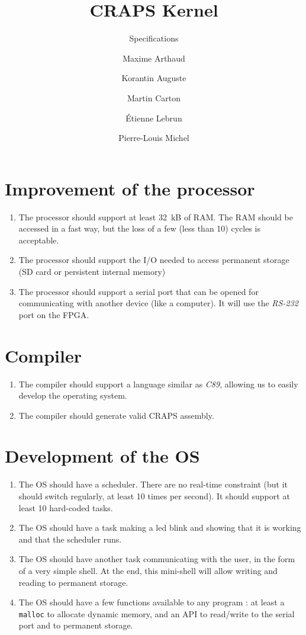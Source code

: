 \documentclass{article}
\title{CRAPS Kernel}
\subtitle{Specifications}
\author{
       Maxime Arthaud
  \and Korantin Auguste
  \and Martin Carton
  \and Étienne Lebrun
  \and Pierre-Louis Michel
}
\begin{document}
  
  \newpage

  \section{Improvement of the processor}
    \begin{enumerate}
      \item The processor should support at least \SI{32}{kB} of RAM. The RAM
        should be accessed in a fast way, but the loss of a few (less than 10)
        cycles is acceptable.
      \item The processor should support the I/O needed to access permanent
        storage (SD card or persistent internal memory)
      \item The processor should support a serial port that can be opened for
        communicating with another device (like a computer). It will use the
        \textit{RS-232} port on the FPGA.
    \end{enumerate}

  \section{Compiler}
    \begin{enumerate}
      \item The compiler should support a language similar as \textit{C89},
        allowing us to easily develop the operating system.
      \item The compiler should generate valid CRAPS assembly.
    \end{enumerate}

  \section{Development of the OS}
    \begin{enumerate}
      \item The OS should have a scheduler. There are no real-time constraint
        (but it should switch regularly, at least 10 times per second). It
        should support at least 10 hard-coded tasks.
      \item The OS should have a task making a led blink and showing that it
        is working and that the scheduler runs.
      \item The OS should have another task communicating with the user, in
        the form of a very simple shell. At the end, this mini-shell will
        allow writing and reading to permanent storage.
      \item The OS should have a few functions available to any program : at
        least a \verb+malloc+ to allocate dynamic memory, and an API to
        read/write to the serial port and to permanent storage.
    \end{enumerate}
\end{document}
